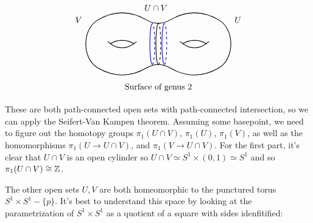 \[
\begin{tikzpicture}
\draw[smooth, thick] (0,1) to[out=30,in=150] (2,1) to[out=-30,in=210] (3,1) to[out=30,in=150] (5,1) to[out=-30,in=30] (5,-1) to[out=210,in=-30] (3,-1) to[out=150,in=30] (2,-1) to[out=210,in=-30] (0,-1) to[out=150,in=-150] (0,1);
\draw[smooth, thick] (0.4,0.1) .. controls (0.8,-0.25) and (1.2,-0.25) .. (1.6,0.1);
\draw[smooth, thick] (0.5,0) .. controls (0.8,0.2) and (1.2,0.2) .. (1.5,0);
\draw[smooth, thick] (3.4,0.1) .. controls (3.8,-0.25) and (4.2,-0.25) .. (4.6,0.1);
\draw[smooth, thick] (3.5,0) .. controls (3.8,0.2) and (4.2,0.2) .. (4.5,0);

\draw[thick] (2.5,-0.85) arc(270:90:0.1 and 0.85);
\draw[dashed, thick] (2.5,-0.85) arc(270:450:0.1 and 0.85);

\draw[blue, thick] (2.75,-0.85) arc(270:90:0.1 and 0.85);
\draw[blue, dashed, thick] (2.75,-0.85) arc(270:450:0.1 and 0.85);

\draw[blue, thick] (2.25,-0.85) arc(270:90:0.1 and 0.85);
\draw[blue, dashed, thick] (2.25,-0.85) arc(270:450:0.1 and 0.85);
 \node at (5.8,1) {$U$};
 \node at (-0.8,1) {$V$};
 \node at (2.4,1.5) {$U\cap V$};
    \node at (2.5,-1.8) {Surface of genus $2$};
\end{tikzpicture}
\]

These are both path-connected open sets with path-connected intersection, so we can apply the Seifert-Van Kampen theorem. Assuming some basepoint, we need to figure out the homotopy groups $\pi_1(U\cap V)$, $\pi_1(U)$, $\pi_1(V)$, as well as the homomorphisms $\pi_1(U \to U\cap V)$, and $\pi_1(V \to U\cap V)$. For the first part, it's clear that $U\cap V$ is an open cylinder so $U\cap V\simeq S^1\times (0,1)\simeq S^1$ and so $\pi_1(U\cap V)\cong \mathbb{Z}$.

The other open sets $U,V$ are both homeomorphic to the punctured torus $S^1\times S^1-\{p\}$. It's best to understand this space by looking at the parametrization of $S^1\times S^1$ as a quotient of a square with sides idenfitified:

